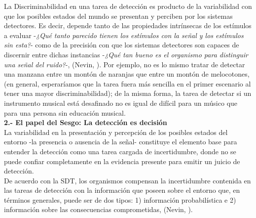 La Discriminabilidad en una tarea de detección es producto de la variabilidad con que los posibles estados del mundo se presentan y perciben por los sistemas detectores. Es decir, depende tanto de las propiedades intrínsecas de los estímulos a evaluar -\textit{¿Qué tanto parecido tienen los estímulos con la señal y los estímulos sin esta?}- como de la precisión con que los sistemas detectores son capaces de discernir entre dichas instancias -\textit{¿Qué tan bueno es el organismo para distinguir una señal del ruido?}-, (Nevin, \citeyear{Nevin1969}). Por ejemplo, no es lo mismo tratar de detectar una manzana entre un montón de naranjas que entre un montón de melocotones, (en general, esperaríamos que la tarea fuera más sencilla en el primer escenario al tener una mayor discriminabilidad); de la misma forma, la tarea de detectar si un instrumento musical está desafinado no es igual de difícil para un músico que para una persona sin educación musical.\\

  \textbf{2.- El papel del Sesgo: La detección es decisión}\\

La variabilidad en la presentación y percepción de los posibles estados del entorno -la presencia o ausencia de la señal- constituye el elemento base para entender la detección como una tarea cargada de incertidumbre, donde no se puede confiar completamente en la evidencia presente para emitir un juicio de detección.\\

De acuerdo con la SDT, los organismos compensan la incertidumbre contenida en las tareas de detección con la información que poseen sobre el entorno que, en términos generales, puede ser de dos tipos: 1) información probabilística e 2) información sobre las consecuencias comprometidas, (Nevin, \citeyear{Nevin1969}).\\

